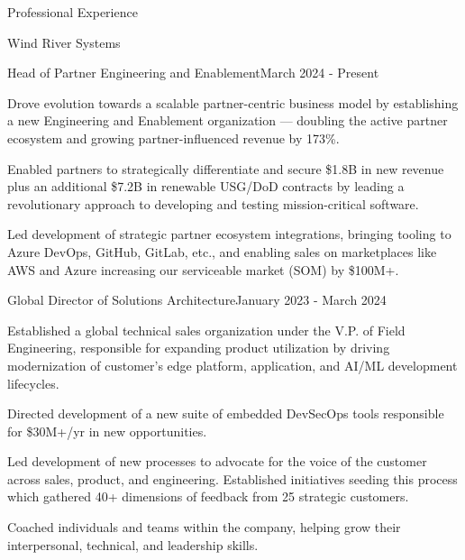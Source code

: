 \documentclass{resume} %
\begin{document}

\begin{rSection}{Professional Experience}

  \begin{rCompany}{Wind River Systems}{}{}
    \begin{rRole}{Head of Partner Engineering and Enablement}{}{March 2024 - Present}
      \item Drove evolution towards a scalable partner-centric business model by establishing a new Engineering and Enablement organization --- doubling the active partner ecosystem and growing partner-influenced revenue by 173\%.
      \item Enabled partners to strategically differentiate and secure \$1.8B in new revenue plus an additional \$7.2B in renewable USG/DoD contracts by leading a revolutionary approach to developing and testing mission-critical software.
      \item Led development of strategic partner ecosystem integrations, bringing tooling to Azure DevOps, GitHub, GitLab, etc., and enabling sales on marketplaces like AWS and Azure increasing our serviceable market (SOM) by \$100M+.
    \end{rRole}
    
    \begin{rRole}{Global Director of Solutions Architecture}{}{January 2023 - March 2024}
      \item Established a global technical sales organization under the V.P. of Field Engineering, responsible for expanding product utilization by driving modernization of customer's edge platform, application, and AI/ML development lifecycles.
      \item Directed development of a new suite of embedded DevSecOps tools responsible for \$30M+/yr in new opportunities.
      \item Led development of new processes to advocate for the voice of the customer across sales, product, and engineering. Established initiatives seeding this process which gathered 40+ dimensions of feedback from 25 strategic customers.
      \item Coached individuals and teams within the company, helping grow their interpersonal, technical, and leadership skills.
    \end{rRole}
  \end{rCompany}


\end{rSection}
\end{document}
